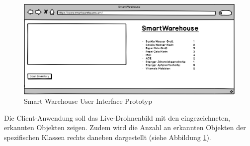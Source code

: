 \begin{figure}[H]
	\begin{center}
		\includegraphics[width=15cm]{Bilder/UI.png} 
		\caption[Smart Warehouse User Interface Prototyp]{Smart Warehouse User Interface Prototyp}
		\label{ui}
	\end{center}
\end{figure}

Die Client-Anwendung soll das Live-Drohnenbild mit den eingezeichneten, erkannten Objekten zeigen. Zudem wird die Anzahl an erkannten Objekten der spezifischen Klassen rechts daneben dargestellt (siehe Abbildung \ref{ui}). 